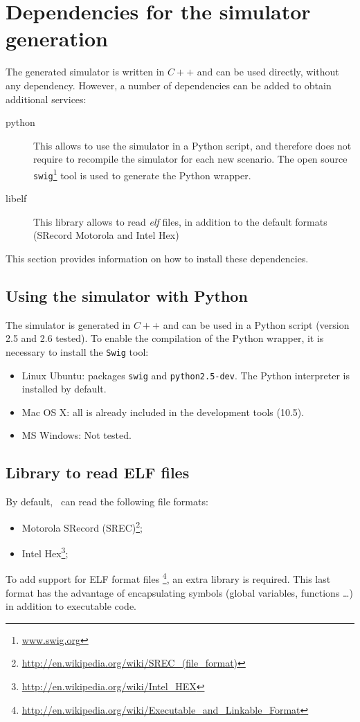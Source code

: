 \section{Dependencies for the simulator generation}

The generated simulator is written in $C++$  and can be used directly, without any dependency. However, a number of dependencies can be added to obtain additional services:
\begin{description}
\item[python] This allows to use the simulator in a Python script, and therefore does not require to recompile the simulator for each new scenario. The open source \texttt{swig}\footnote{\url{www.swig.org}} tool is used to generate the Python wrapper.
\item[libelf] This library allows to read \emph{elf} files, in addition to the default formats (SRecord Motorola and Intel Hex)
\end{description}

This section provides information on how to install these dependencies.

\subsection{Using the simulator with Python}
The simulator is generated in $C++$  and can be used in a Python script (version 2.5 and 2.6 tested). To enable the compilation of the Python wrapper, it is necessary to install the \texttt{Swig} tool:
\begin{itemize}
\item Linux Ubuntu: packages \texttt{swig} and \texttt{python2.5-dev}. The Python interpreter is installed by default.
\item Mac OS X: all is already included in the development tools (10.5).
\item MS Windows: Not tested.
\end{itemize}

\subsection{Library to read ELF files}
\label{sec:elf}
By default, \gadl\ can read the following file formats:
\begin{itemize}
\item Motorola SRecord (SREC)\footnote{\url{http://en.wikipedia.org/wiki/SREC_(file_format)}};
\item Intel Hex\footnote{\url{http://en.wikipedia.org/wiki/Intel_HEX}};
\end{itemize}
To add support for ELF format files \footnote{\url{http://en.wikipedia.org/wiki/Executable_and_Linkable_Format}}, an extra library is required. This last format has the advantage of encapsulating symbols (global variables, functions \ldots) in addition to executable code. 


